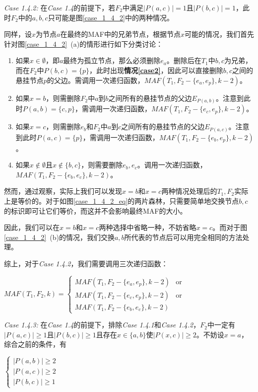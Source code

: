 \textit{Case 1.4.2: }在\textit{Case 1.4}的前提下，若$F_2$中满足$|P(a,c)|=1$且$|P(b,c)|=1$，此时$F_2$中的$a,b,c$只可能是图\ref{case_1_4_2}中的两种情况。

同样，设$x$为节点$a$在最终的MAF中的兄弟节点，根据节点$x$可能的情况，我们首先针对图\ref{case_1_4_2}~(a)的情形进行如下分类讨论：
\begin{enumerate}
	\item 如果$x \in \emptyset$，即$a$最终为孤立节点，那么必须删除$e_a$。删除后在$T_1$中$b,c$为兄弟，而在$F_2$中$P(b,c)=\{p\}$，此时出现\textbf{情况\ref{case2}}，因此可以直接删除$b,c$之间的悬挂节点$p$的父边。需调用一次递归函数，$MAF(T_1,F_2-\{e_a,e_p\},k-2)$。
	\item 如果$x = b$，则需删除$F_2$中$a$到$b$之间所有的悬挂节点的父边$E_{P(a,b)}$。注意到此时$P(a,b)=\{c,p\}$，需调用一次递归函数，$MAF(T_1,F_2-\{e_c,e_p\},k-2)$。
	\item 如果$x = c$，则需删除$e_b$和$F_2$中$a$到$c$之间所有的悬挂节点的父边$E_{P(a,c)}$。注意到此时$P(a,c)=\{p\}$，需调用一次递归函数，$MAF(T_1,F_2-\{e_b,e_p\},k-2)$。
	\item 如果$x \notin \emptyset$且$x \notin \{b,c\}$，则需要删除$e_b,e_c$。调用一次递归函数，$MAF(T_1,F_2-\{e_b,e_c\},k-2)$。
\end{enumerate}

然而，通过观察，实际上我们可以发现$x=b$和$x=c$两种情况处理后的$T_1,F_2$实际上是等价的。对于如图\ref{case_1_4_2_eq}的两片森林，只需要简单地交换节点$b,c$的标识即可让它们等价，而这并不会影响最终MAF的大小。

因此，我们可以在$x=b$和$x=c$两种选择中省略一种，不妨省略$x=c$。而对于图\ref{case_1_4_2}~(b)的情况，我们交换$a,b$所代表的节点后可以用完全相同的方法处理。

综上，对于\textit{Case 1.4.2}，我们需要调用三次递归函数：
\begin{center}
$MAF(T_1,F_2,k) = \left\{
\begin{array}{lr}
         MAF(T_1,F_2-\{e_a,e_p\},k-2) & \mbox{or}\\ 
         MAF(T_1,F_2-\{e_c,e_p\},k-2) & \mbox{or}\\
         MAF(T_1,F_2-\{e_b,e_c\},k-2) & 
\end{array}
\right.$
\end{center}
$ $\\

\textit{Case 1.4.3: }在\textit{Case 1.4}的前提下，排除\textit{Case 1.4.1}和\textit{Case 1.4.2}，$F_2$中一定有$|P(a,c)| \ge 1$且$|P(b,c)| \ge 1$且存在$x \in \{a,b\}$使$|P(x,c)| \ge 2$。不妨设$x=a$，综合之前的条件，有
\begin{center}
$\left\{
\begin{array}{l}
	|P(a,b)| \ge 2\\
	|P(a,c)| \ge 2\\
	|P(b,c)| \ge 1
\end{array}
\right.$
\end{center}

